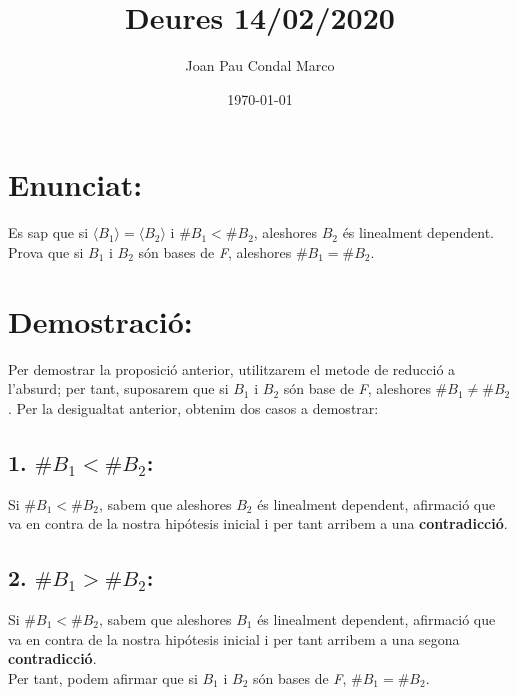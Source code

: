 \documentclass[a4paper, 11pt]{article}
\title{Deures 14/02/2020}
\author{Joan Pau Condal Marco}
\date{\today}
\begin{document}
    \maketitle
    \justify

    \section*{Enunciat:}
        Es sap que si ${\langle B_1\rangle=\langle B_2\rangle}$ i ${\#B_1 < \#B_2}$, aleshores ${B_2}$ \'es linealment dependent.\\
        Prova que si ${B_1}$ i ${B_2}$ s\'on bases de \emph{F}, aleshores ${\#B_1 = \#B_2}$.

    \section*{Demostraci\'o:}
        Per demostrar la proposici\'o anterior, utilitzarem el metode de reducci\'o a l'absurd; per tant, suposarem que si ${B_1}$ i ${B_2}$ s\'on base de \emph{F}, aleshores ${\# B_1 \neq \# B_2}$. Per la desigualtat anterior, obtenim dos casos a demostrar:

        \subsection*{1. ${\# B_1 < \# B_2}$:}
            Si ${\# B_1 < \# B_2}$, sabem que aleshores ${B_2}$ \'es linealment dependent, afirmaci\'o que va en contra de la nostra hip\'otesis inicial i per tant arribem a una \textbf{contradicci\'o}.
            
        \subsection*{2. ${\# B_1 > \# B_2}$:}
            Si ${\# B_1 < \# B_2}$, sabem que aleshores ${B_1}$ \'es linealment dependent, afirmaci\'o que va en contra de la nostra hip\'otesis inicial i per tant arribem a una segona \textbf{contradicci\'o}.\\
    
        Per tant, podem afirmar que si ${B_1}$ i ${B_2}$ s\'on bases de \emph{F}, ${\#B_1 = \#B_2}$.
\end{document}
